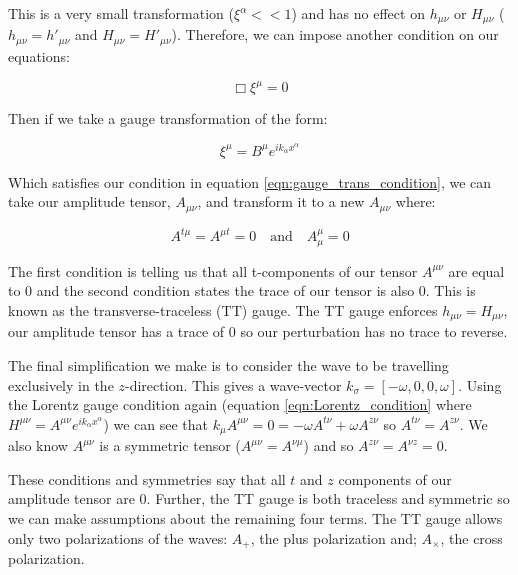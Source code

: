 This is a very small transformation ($\xi^{\alpha} << 1$) and has no effect on $h_{\mu \nu}$ or $H_{\mu \nu}$ ($h_{\mu \nu} = h'_{\mu \nu}$ and $H_{\mu \nu} = H'_{\mu \nu}$). Therefore, we can impose another condition on our equations:

\begin{equation}
   \Box \xi^{\mu} = 0
   \label{eqn:gauge_trans_condition}
\end{equation}

Then if we take a gauge transformation of the form:

\begin{equation}
   \xi^{\mu} = B^{\mu} e^{i k_\alpha x^{\alpha}}
   \label{eqn:gauge_transformation_form}
\end{equation}

Which satisfies our condition in equation \ref{eqn:gauge_trans_condition}, we can take our amplitude tensor, $A_{\mu \nu}$, and transform it to a new $A_{\mu \nu}$ where:

\begin{equation}
    A^{t \mu} = A^{\mu t} = 0 \quad \text{and} \quad A^\mu_\mu = 0
    \label{eqn:TT_conditions}
\end{equation}

The first condition is telling us that all t-components of our tensor $A^{\mu \nu}$ are equal to 0 and the second condition states the trace of our tensor is also 0. This is known as the transverse-traceless (TT) gauge. The TT gauge enforces $h_{\mu \nu} = H_{\mu \nu}$, our amplitude tensor has a trace of 0 so our perturbation has no trace to reverse.

The final simplification we make is to consider the wave to be travelling exclusively in the $z$-direction. This gives a wave-vector $k_\sigma = [-\omega, 0, 0, \omega]$. Using the Lorentz gauge condition again (equation \ref{eqn:Lorentz_condition} where $H^{\mu \nu} = A^{\mu \nu} e^{i k_\alpha x^{\alpha}}$) we can see that $k_\mu A^{\mu \nu} = 0 = -\omega A^{t \nu} + \omega A^{z \nu}$ so $A^{t \nu} = A^{z \nu}$. We also know $A^{\mu \nu}$
is a symmetric tensor ($A^{\mu \nu} = A^{\nu \mu}$) and so $A^{z \nu} = A^{\nu z} = 0$.

These conditions and symmetries say that all $t$ and $z$ components of our amplitude tensor are 0. Further, the TT gauge is both traceless and symmetric so we can make assumptions about the remaining four terms. The TT gauge allows
only two polarizations of the waves: $A_{+}$, the plus polarization and; $A_{\times}$, the cross polarization.

